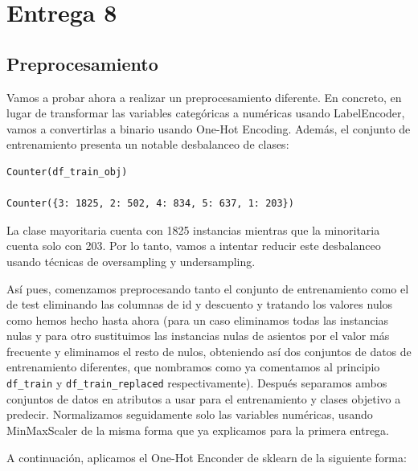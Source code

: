 \documentclass[a4paper,11pt]{article}
\begin{document}
\section{Entrega 8}
\subsection{Preprocesamiento}
Vamos a probar ahora a realizar un preprocesamiento diferente. En concreto, en lugar de transformar las variables categóricas a numéricas usando LabelEncoder, vamos a convertirlas a binario usando One-Hot Encoding. Además, el conjunto de entrenamiento presenta un notable desbalanceo de clases:
\begin{verbatim}
Counter(df_train_obj)

Counter({3: 1825, 2: 502, 4: 834, 5: 637, 1: 203})
\end{verbatim}

La clase mayoritaria cuenta con 1825 instancias mientras que la minoritaria cuenta solo con 203.  Por lo tanto, vamos a intentar reducir este desbalanceo usando técnicas de oversampling y undersampling. 

Así pues, comenzamos preprocesando tanto el conjunto de entrenamiento como el de test eliminando las columnas de id y descuento y tratando los valores nulos como hemos hecho hasta ahora (para un caso eliminamos todas las instancias nulas y para otro sustituimos las instancias nulas de asientos por el valor más frecuente y eliminamos el resto de nulos, obteniendo así dos conjuntos de datos de entrenamiento diferentes, que nombramos como ya comentamos al principio \texttt{df_train} y \texttt{df_train_replaced} respectivamente). Después separamos ambos conjuntos de datos en atributos a usar para el entrenamiento y clases objetivo a predecir. Normalizamos seguidamente solo las variables numéricas, usando MinMaxScaler de la misma forma que ya explicamos para la primera entrega. 

A continuación, aplicamos el One-Hot Enconder de sklearn de la siguiente forma:
\end{document}

